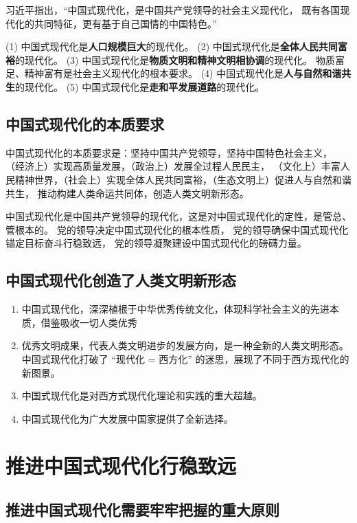 \documentclass[UTF8,10pt]{ctexbook} %
\begin{document}
习近平指出，“中国式现代化，是中国共产党领导的社会主义现代化，
既有各国现代化的共同特征，更有基于自己国情的中国特色。”

(1) 中国式现代化是\textbf{人口规模巨大}的现代化。
(2) 中国式现代化是\textbf{全体人民共同富裕}的现代化。
(3) 中国式现代化是\textbf{物质文明和精神文明相协调}的现代化。
物质富足、精神富有是社会主义现代化的根本要求。
(4) 中国式现代化是\textbf{人与自然和谐共生}的现代化。
(5) 中国式现代化是\textbf{走和平发展道路}的现代化。

\subsection{中国式现代化的本质要求}

中国式现代化的本质要求是：坚持中国共产党领导，坚持中国特色社会主义，
（经济上）实现高质量发展，（政治上）发展全过程人民民主，
（文化上）丰富人民精神世界，（社会上）实现全体人民共同富裕，（生态文明上）促进人与自然和谐共生，
推动构建人类命运共同体，创造人类文明新形态。

中国式现代化是中国共产党领导的现代化，这是对中国式现代化的定性，是管总、管根本的。
党的领导决定中国式现代化的根本性质，
党的领导确保中国式现代化锚定目标奋斗行稳致远，
党的领导凝聚建设中国式现代化的磅礴力量。

\subsection{中国式现代化创造了人类文明新形态}


\begin{enumerate}[itemsep=0pt, label=(\arabic*)]
    \item 中国式现代化，深深植根于中华优秀传统文化，体现科学社会主义的先进本质，借鉴吸收一切人类优秀
    \item 优秀文明成果，代表人类文明进步的发展方向，是一种全新的人类文明形态。中国式现代化打破了 “现代化 = 西方化” 的迷思，展现了不同于西方现代化的新图景。
    \item 中国式现代化是对西方式现代化理论和实践的重大超越。
    \item 中国式现代化为广大发展中国家提供了全新选择。
\end{enumerate}

\section{推进中国式现代化行稳致远}

\subsection{推进中国式现代化需要牢牢把握的重大原则}
\end{document}
